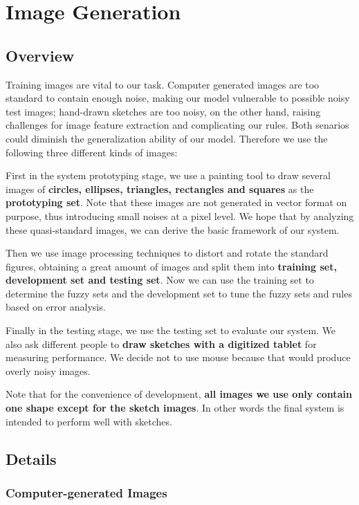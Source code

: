 \section{Image Generation}

\subsection{Overview}

Training images are vital to our task. Computer generated images are too standard to contain enough noise, making our model vulnerable to possible noisy test images; hand-drawn sketches are too noisy, on the other hand, raising challenges for image feature extraction and complicating our rules. Both senarios could diminish the generalization ability of our model. Therefore we use the following three different kinds of images:

First in the system prototyping stage, we use a painting tool to draw several images of \textbf{circles, ellipses, triangles, rectangles and squares} as the \textbf{prototyping set}. Note that these images are not generated in vector format on purpose, thus introducing small noises at a pixel level. We hope that by analyzing these quasi-standard images, we can derive the basic framework of our system.

Then we use image processing techniques to distort and rotate the standard figures, obtaining a great amount of images and split them into \textbf{training set, development set and testing set}. Now we can use the training set to determine the fuzzy sets and the development set to tune the fuzzy sets and rules based on error analysis.

Finally in the testing stage, we use the testing set to evaluate our system. We also ask different people to \textbf{draw sketches with a digitized tablet} for measuring performance. We decide not to use mouse because that would produce overly noisy images.

Note that for the convenience of development, \textbf{all images we use only contain one shape except for the sketch images}. In other words the final system is intended to perform well with sketches.

\subsection{Details}

\subsubsection{Computer-generated Images}

